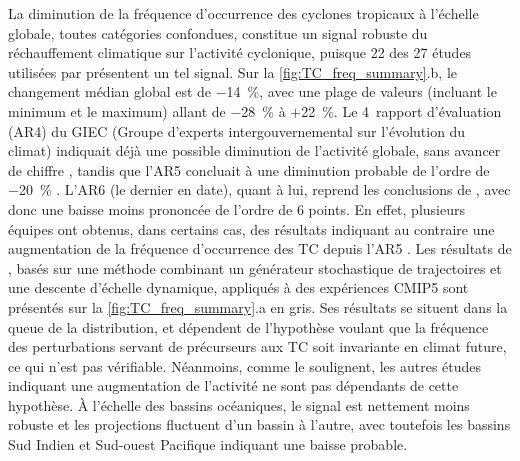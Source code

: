\documentclass[../main.tex]{subfiles}
\begin{document}
La diminution de la fréquence d'occurrence des cyclones tropicaux à l'échelle globale, toutes catégories confondues, constitue un signal robuste du
réchauffement climatique sur l'activité cyclonique, puisque \num{22} des \num{27} études utilisées par \citeauthor{knutson_tropical_2020} présentent un tel
signal. Sur la \cref{fig:TC_freq_summary}.b, le changement médian global est de \SI{-14}{\percent}, avec une plage de valeurs (incluant le minimum et le
maximum) allant de \SI{-28}{\percent} à $+$\SI{22}{\percent}. Le \num{4}\ieme~rapport d'évaluation (AR4) du GIEC (Groupe d'experts intergouvernemental sur
l’évolution du climat) indiquait déjà une possible diminution de l'activité globale, sans avancer de chiffre \parencite{meehl_global_2007}, tandis que l'AR5
concluait à une diminution probable de l'ordre de \SI{-20}{\percent} \parencite{christensen_climate_2013}. L'AR6 (le dernier en date), quant à lui, reprend les
conclusions de \cite{knutson_tropical_2020} \parencite{seneviratne_weather_2021}, avec donc une baisse moins prononcée de l'ordre de \num{6} points. En effet,
plusieurs équipes ont obtenus, dans certains cas, des résultats indiquant au contraire une augmentation de la fréquence d'occurrence des TC depuis l'AR5
\parencite{camargo_global_2013,emanuel_downscaling_2013,wehner_resolution_2015,bhatia_projected_2018}. Les résultats de \cite{emanuel_downscaling_2013}, basés
sur une méthode combinant un générateur stochastique de trajectoires et une descente d'échelle dynamique, appliqués à des expériences CMIP5 sont présentés sur
la \cref{fig:TC_freq_summary}.a en gris. Ses résultats se situent dans la queue de la distribution, et dépendent de l'hypothèse voulant que la fréquence des
perturbations servant de précurseurs aux TC soit invariante en climat future, ce qui n'est pas vérifiable. Néanmoins, comme \cite{knutson_tropical_2020} le
soulignent, les autres études indiquant une augmentation de l'activité ne sont pas dépendants de cette hypothèse. À l'échelle des bassins océaniques, le signal
est nettement moins robuste et les projections fluctuent d'un bassin à l'autre, avec toutefois les bassins Sud Indien et Sud-ouest Pacifique indiquant une
baisse probable.
\end{document}
